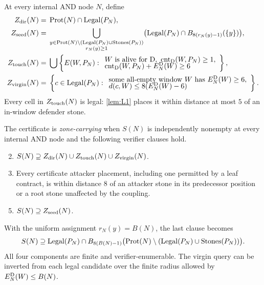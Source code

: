 \begin{definition}
\label{def:D11}
At every internal AND node $N$, define
\begin{align*}
Z_{\mathrm{dir}}(N)={}&\operatorname{Prot}(N)\cap\operatorname{Legal}(P_N),\\
Z_{\mathrm{seed}}(N)={}&
 \bigcup_{\substack{y\in\operatorname{Prot}(N)\setminus
   (\operatorname{Legal}(P_N)\cup\operatorname{Stones}(P_N))\\ r_N(y)\ge1}}
 \bigl(\operatorname{Legal}(P_N)\cap B_{8(r_N(y)-1)}(\{y\})\bigr),\\
Z_{\mathrm{touch}}(N)={}&
 \bigcup\left\{E(W,P_N):
 \begin{array}{l}
 W\text{ is alive for }\mathrm{D},\ \operatorname{cnt}_{\mathrm{D}}(W,P_N)\ge1,\\[-1mm]
 \operatorname{cnt}_{\mathrm{D}}(W,P_N)+E_N^{\mathrm{D}}(W)\ge6
 \end{array}\right\},\\
Z_{\mathrm{virgin}}(N)={}&
 \left\{c\in\operatorname{Legal}(P_N):
 \begin{array}{l}
 \text{some all-empty window }W\text{ has }E_N^{\mathrm{D}}(W)\ge6,\\[-1mm]
 d(c,W)\le8(E_N^{\mathrm{D}}(W)-6)
 \end{array}\right\}.
\end{align*}
Every cell in $Z_{\mathrm{touch}}(N)$ is legal: \cref{lem:L1} places it within distance
at most $5$ of an in-window defender stone.

The certificate is \emph{zone-carrying} when $S(N)$ is independently
nonempty at every internal AND node and the following verifier clauses hold.
\begin{enumerate}[label=\textup{(Z\arabic*)},leftmargin=12mm]
  \setcounter{enumi}{1}
  \item \label{zone:Z2}
  $S(N)\supseteq Z_{\mathrm{dir}}(N)\cup Z_{\mathrm{touch}}(N)\cup Z_{\mathrm{virgin}}(N)$.
  \setcounter{enumi}{3}
  \item \label{zone:Z4}
  Every certificate attacker placement, including one permitted by a leaf
  contract, is within distance $8$ of an attacker stone in its predecessor
  position or a root stone unaffected by the coupling.
\end{enumerate}
\begin{enumerate}[label=\textup{(Z5$'$)},leftmargin=12mm]
  \setcounter{enumi}{4}
  \item \label{zone:Z5prime}
  $S(N)\supseteq Z_{\mathrm{seed}}(N)$.
\end{enumerate}
With the uniform assignment $r_N(y)=B(N)$, the last clause becomes
\[
 S(N)\supseteq\operatorname{Legal}(P_N)\cap B_{8(B(N)-1)}
 \bigl(\operatorname{Prot}(N)\setminus(\operatorname{Legal}(P_N)\cup\operatorname{Stones}(P_N))\bigr).
\]
All four components are finite and verifier-enumerable.  The virgin query can
be inverted from each legal candidate over the finite radius allowed by
$E_N^{\mathrm{D}}(W)\le B(N)$.
\end{definition}

